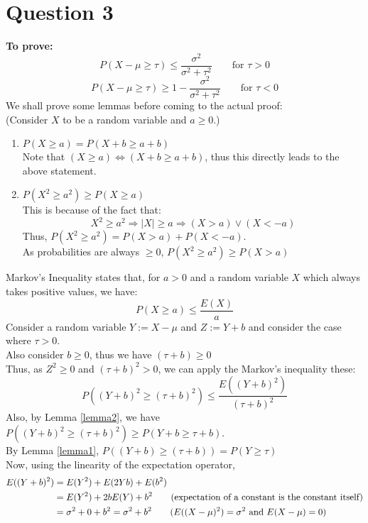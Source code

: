 \documentclass[11pt, fleqn]{article}
\begin{document}
\section*{Question 3}
\setcounter{equation}{0}
\textbf{To prove:}
$$ 
P(X-\mu \ge \tau) \le \frac{\sigma^2}{\sigma^2+\tau^2} \hspace{2em} \text{for } \tau > 0
$$
$$ 
P(X-\mu \ge \tau) \ge 1 - \frac{\sigma^2}{\sigma^2+\tau^2} \hspace{2em} \text{for } \tau < 0
$$
We shall prove some lemmas before coming to the actual proof:\\
(Consider $X$ to be a random variable and $a \ge 0$.)
\begin{enumerate}
    \item $P(X \ge a) = P(X+b \ge a+b)$\\
    \label{lemma1}
    Note that $ (X \ge a) \iff (X+b \ge a+b) $,
    thus this directly leads to the above statement.
    \item $ P(X^2 \ge a^2) \ge P(X \ge a) $\\
    \label{lemma2}
    This is because of the fact that:
    $$ X^2 \ge a^2 \Rightarrow |X| \ge a \Rightarrow (X > a) \lor (X < -a) $$
    Thus, $ P(X^2 \ge a^2) = P(X > a) + P(X < -a)$. \\
    As probabilities are always  $\ge 0$, $ P(X^2 \ge a^2) \ge P(X > a) $
\end{enumerate}
Markov's Inequality states that, for $a > 0$ and a random variable $X$ which always takes positive values, we have:
$$ P(X \ge a) \le \frac{E(X)}{a} $$
Consider a random variable $Y := X - \mu$ and $Z := Y + b$ and consider the case where $\tau > 0$. \\
Also consider $b \ge 0$, thus we have $(\tau + b) \ge 0$\\
Thus, as $Z^2 \ge 0$ and $ (\tau + b)^2 > 0 $, we can apply the Markov's inequality these:
$$ P((Y+b)^2 \ge (\tau + b)^2) \le \frac{E((Y+b)^2)}{(\tau + b)^2} $$
Also, by Lemma \ref{lemma2}, we have $ P((Y+b)^2 \ge (\tau + b)^2) \ge P(Y+b \ge \tau + b) $.\\
By Lemma \ref{lemma1}, $ P((Y+b) \ge (\tau + b)) = P(Y \ge \tau) $\\
Now, using the linearity of the expectation operator,
$$
\begin{aligned}
    E((Y+b)^2) &= E(Y^2) + E(2Yb) + E(b^2)\\
    &= E(Y^2) + 2bE(Y) + b^2 \hspace{2em} \text{(expectation of a constant is the constant itself)}\\
    &= \sigma^2 + 0 + b^2 = \sigma^2 + b^2 \hspace{2em} (E((X-\mu)^2) = \sigma^2 \text{ and $ E(X-\mu) = 0 $)}
\end{aligned}
$$
\end{document}
